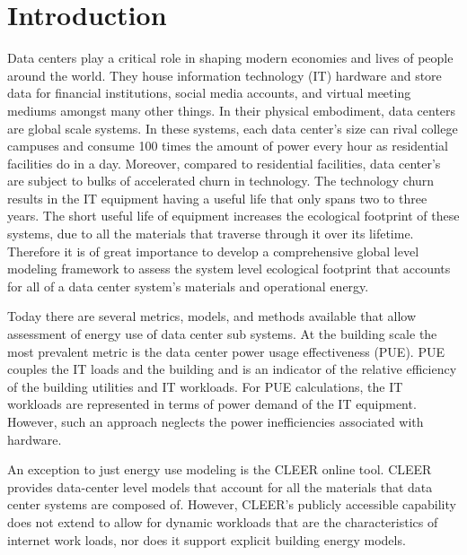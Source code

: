 \section{Introduction}

Data centers play a critical role in shaping modern economies and lives of people around the world. They house information technology (IT) hardware and store data for financial institutions, social media accounts, and virtual meeting mediums amongst many other things. In their physical embodiment, data centers are global scale systems. In these systems, each data center’s size can rival college campuses and consume 100 times the amount of power every hour as residential facilities do in a day. Moreover, compared to residential facilities, data center’s are subject to bulks of accelerated churn in technology. The technology churn results in the IT equipment having a useful life that only spans two to three years. The short useful life of equipment increases the ecological footprint of these systems, due to all the materials that traverse through it over its lifetime. Therefore it is of great importance to develop a comprehensive global level modeling framework to assess the system level ecological footprint that accounts for all of a data center system’s materials and operational energy.

Today there are several metrics, models, and methods available that allow assessment of energy use of data center sub systems. At the building scale the most prevalent metric is the data center power usage effectiveness (PUE). PUE couples the IT loads and the building and is an indicator of the relative efficiency of the building utilities and IT workloads. For PUE calculations, the IT workloads are represented in terms of power demand of the IT equipment. However, such an approach neglects the power inefficiencies associated with hardware. 

An exception to just energy use modeling is the CLEER online tool. CLEER provides data-center level models that account for all the materials that data center systems are composed of. However, CLEER’s publicly accessible capability does not extend to allow for dynamic workloads that are the characteristics of internet work loads, nor does it support explicit building energy models. 

